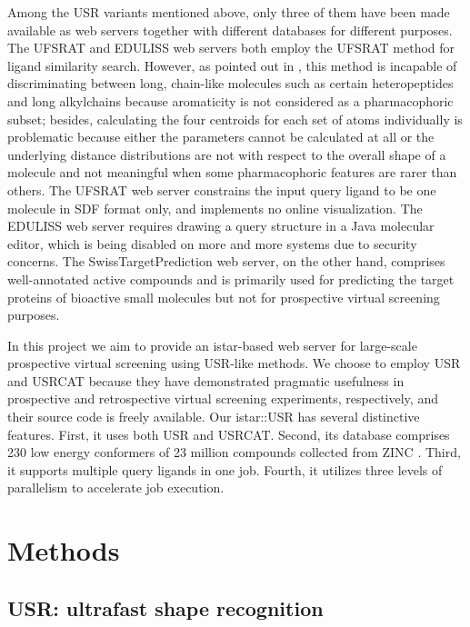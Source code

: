 Among the USR variants mentioned above, only three of them \citep{1436,1437,1408} have been made available as web servers together with different databases for different purposes. The UFSRAT \citep{1436} and EDULISS \citep{1437} web servers both employ the UFSRAT \citep{1436} method for ligand similarity search. However, as pointed out in \citep{1331}, this method is incapable of discriminating between long, chain-like molecules such as certain heteropeptides and long alkylchains because aromaticity is not considered as a pharmacophoric subset; besides, calculating the four centroids for each set of atoms individually is problematic because either the parameters cannot be calculated at all or the underlying distance distributions are not with respect to the overall shape of a molecule and not meaningful when some pharmacophoric features are rarer than others. The UFSRAT \citep{1436} web server constrains the input query ligand to be one molecule in SDF format only, and implements no online visualization. The EDULISS \citep{1437} web server requires drawing a query structure in a Java molecular editor, which is being disabled on more and more systems due to security concerns. The SwissTargetPrediction \citep{1408} web server, on the other hand, comprises well-annotated active compounds and is primarily used for predicting the target proteins of bioactive small molecules but not for prospective virtual screening purposes.

In this project we aim to provide an istar-based \citep{1362} web server for large-scale prospective virtual screening using USR-like methods. We choose to employ USR \citep{1379} and USRCAT \citep{1331} because they have demonstrated pragmatic usefulness in prospective \citep{1380} and retrospective \citep{1331} virtual screening experiments, respectively, and their source code is freely available. Our istar::USR has several distinctive features. First, it uses both USR and USRCAT. Second, its database comprises 230 low energy conformers of 23 million compounds collected from ZINC \cite{532,1178}. Third, it supports multiple query ligands in one job. Fourth, it utilizes three levels of parallelism to accelerate job execution.

\section{Methods}

\subsection{USR: ultrafast shape recognition}

